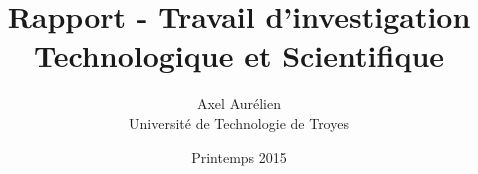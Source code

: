 \documentclass[11pt]{report}
\title{Rapport - Travail d'investigation Technologique et Scientifique}
\author{Axel \bsc{Mousset} Aurélien \bsc{Labate} \\ Université de Technologie de Troyes}
\date{Printemps 2015}
\begin{document}
    \maketitle
    
    \tableofcontents

    
    
    
    

    \appendix
    

    \nocite{*}
    
    
\end{document}
